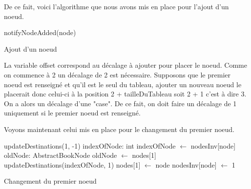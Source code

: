 			De ce fait, voici l'algorithme que nous avons mis en place pour l'ajout d'un noeud.

			\begin{algorithm}[H]
				\DontPrintSemicolon



				notifyNodeAdded(node)
				\caption{Ajout d'un noeud}
			\end{algorithm}

			La variable offset correspond au décalage à ajouter pour placer le noeud. Comme on commence à 2 un décalage de 2 est nécessaire. Supposons que le premier noeud est renseigné et qu'il est le seul du tableau, ajouter un nouveau noeud le placerait donc celui-ci à la position 2 + tailleDuTableau soit 2 + 1 c'est à dire 3. On a alors un décalage d'une "case". De ce fait, on doit faire un décalage de 1 uniquement si le premier noeud est renseigné.

			Voyons maintenant celui mis en place pour le changement du premier noeud.

			\begin{algorithm}[H]
				\DontPrintSemicolon

				\;
				updateDestinations(1, -1)\;
				\;
				indexOfNode: int\;
				indexOfNode $\gets$ nodesInv[node]\;
				\;
				oldNode: AbstractBookNode\;
				oldNode $\gets$ nodes[1]\;
				\;
				updateDestinations(indexOfNode, 1)\;
				\;
				nodes[1] $\gets$ node\;
				nodesInv[node] $\gets$ 1\;
				\;

				\caption{Changement du premier noeud}
			\end{algorithm}

